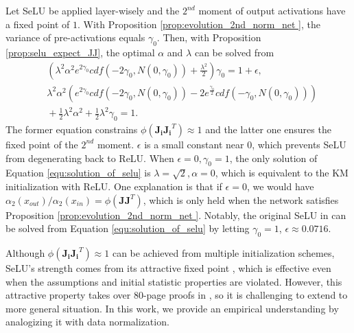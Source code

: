 \documentclass[10pt,journal,compsoc]{IEEEtran}
\begin{document}
Let SeLU be applied layer-wisely and the $2^{nd}$ moment of output activations have a fixed point of $1$. With Proposition \ref{prop:evolution_2nd_norm_net }, the variance of pre-activations equals $\gamma_0$. Then, with Proposition \ref{prop:selu_expect_JJ}, the optimal $\alpha$ and $\lambda$ can be solved from
\begin{equation}
    \begin{split}
        & \left(\lambda^2\alpha^2e^{2\gamma_0}cdf(-2\gamma_0, N(0, \gamma_0))+ \frac{\lambda^2}{2}\right)\gamma_0 = 1 + \epsilon,\\
        & \lambda^2\alpha^2\left(e^{2\gamma_0}cdf(-2\gamma_0, N(0, \gamma_0)) - 2e^{\frac{\gamma_0}{2}}cdf(-\gamma_0, N(0, \gamma_0))\right) \\
        &\! +\! \frac{1}{2}\lambda^2\alpha^2 + \frac{1}{2}\lambda^2\gamma_0\! =\! 1.
    \end{split}
\label{equ:solution_of_selu}
\end{equation}
The former equation constrains $\phi(\mathbf{J_iJ_i}^T)\approx 1$ and the latter one ensures the fixed point of the $2^{nd}$ moment. $\epsilon$ is a small constant near $0$, which prevents SeLU from degenerating back to ReLU. When $\epsilon=0, \gamma_0=1$, the only solution of Equation \eqref{equ:solution_of_selu} is $\lambda=\sqrt{2}, \alpha=0$, which is equivalent to the KM initialization with ReLU. One explanation is that if $\epsilon=0$, we would have $\alpha_2(x_{out})/\alpha_2(x_{in})=\phi(\mathbf{JJ}^T)$, which is only held when the network satisfies Proposition \ref{prop:evolution_2nd_norm_net }. Notably, the original SeLU in \cite{klambauer2017self} can be solved from Equation \eqref{equ:solution_of_selu} by letting $\gamma_0=1$, $\epsilon\approx0.0716$.

Although $\phi(\mathbf{J_iJ_i}^T)\approx1$ can be achieved from multiple initialization schemes, SeLU's strength comes from its attractive fixed point \cite{klambauer2017self}, which is effective even when the assumptions and initial statistic properties are violated. However, this attractive property takes over 80-page proofs in \cite{klambauer2017self}, so it is challenging to extend to more general situation. In this work, we provide an empirical understanding by analogizing it with data normalization.
\end{document}
